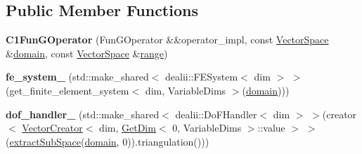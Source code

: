 \subsection*{\-Public \-Member \-Functions}
\begin{DoxyCompactItemize}
\item 
\hypertarget{classSpacy_1_1dealII_1_1C1FunGOperator_3_01FunGOperator_00_01dim_00_01VariableDim_3_01variable__dims_8_8_8_4_01_4_a03ff9a324689d71f58cf4901a7398679}{{\bfseries \-C1\-Fun\-G\-Operator} (\-Fun\-G\-Operator \&\&operator\-\_\-impl, const \hyperlink{classSpacy_1_1VectorSpace}{\-Vector\-Space} \&\hyperlink{classSpacy_1_1OperatorBase_a2588f9b3e0188820c4c494e63293dc6f}{domain}, const \hyperlink{classSpacy_1_1VectorSpace}{\-Vector\-Space} \&\hyperlink{classSpacy_1_1OperatorBase_ab19d3b7a6f290b1079248f1e567e53d6}{range})}\label{classSpacy_1_1dealII_1_1C1FunGOperator_3_01FunGOperator_00_01dim_00_01VariableDim_3_01variable__dims_8_8_8_4_01_4_a03ff9a324689d71f58cf4901a7398679}

\item 
\hypertarget{classSpacy_1_1dealII_1_1C1FunGOperator_3_01FunGOperator_00_01dim_00_01VariableDim_3_01variable__dims_8_8_8_4_01_4_ad8b7b40d11448df1583f7df9d82b64ae}{{\bfseries fe\-\_\-system\-\_\-} (std\-::make\-\_\-shared$<$ dealii\-::\-F\-E\-System$<$ dim $>$ $>$(get\-\_\-finite\-\_\-element\-\_\-system$<$ dim, \-Variable\-Dims $>$(\hyperlink{classSpacy_1_1OperatorBase_a2588f9b3e0188820c4c494e63293dc6f}{domain})))}\label{classSpacy_1_1dealII_1_1C1FunGOperator_3_01FunGOperator_00_01dim_00_01VariableDim_3_01variable__dims_8_8_8_4_01_4_ad8b7b40d11448df1583f7df9d82b64ae}

\item 
\hypertarget{classSpacy_1_1dealII_1_1C1FunGOperator_3_01FunGOperator_00_01dim_00_01VariableDim_3_01variable__dims_8_8_8_4_01_4_a5b3d6bad8928fd972ecfaba0d60b8654}{{\bfseries dof\-\_\-handler\-\_\-} (std\-::make\-\_\-shared$<$ dealii\-::\-Do\-F\-Handler$<$ dim $>$ $>$(creator$<$ \hyperlink{classSpacy_1_1dealII_1_1VectorCreator}{\-Vector\-Creator}$<$ dim, \hyperlink{structSpacy_1_1dealII_1_1GetDim}{\-Get\-Dim}$<$ 0, \-Variable\-Dims $>$\-::value $>$ $>$(\hyperlink{group__ProductSpaceGroup_ga6054e5c78652ac4959f5d521acadd86a}{extract\-Sub\-Space}(\hyperlink{classSpacy_1_1OperatorBase_a2588f9b3e0188820c4c494e63293dc6f}{domain}, 0)).triangulation()))}\label{classSpacy_1_1dealII_1_1C1FunGOperator_3_01FunGOperator_00_01dim_00_01VariableDim_3_01variable__dims_8_8_8_4_01_4_a5b3d6bad8928fd972ecfaba0d60b8654}


\end{DoxyCompactItemize}
